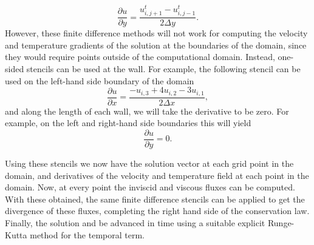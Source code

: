 \begin{equation}
	\frac{\partial u}{\partial y} = \frac{u_{i,j+1}^t - u_{i,j-1}^t}{2 \Delta y}.
\end{equation}
However, these finite difference methods will not work for computing the velocity and temperature gradients of the solution at the boundaries of the domain, since they would require points outside of the computational domain. Instead, one-sided stencils can be used at the wall. For example, the following stencil can be used on the left-hand side boundary of the domain
\begin{equation}
	\frac{\partial u}{\partial x} = \frac{-u_{i,3} + 4u_{i,2} - 3u_{i,1}}{2\Delta x},
\end{equation}
and along the length of each wall, we will take the derivative to be zero. For example, on the left and right-hand side boundaries this will yield
\begin{equation}
	\frac{\partial u}{\partial y} = 0.
\end{equation}

Using these stencils we now have the solution vector at each grid point in the domain, and derivatives of the velocity and temperature field at each point in the domain. Now, at every point the inviscid and viscous fluxes can be computed. With these obtained, the same finite difference stencils can be applied to get the divergence of these fluxes, completing the right hand side of the conservation law. Finally, the solution and be advanced in time using a suitable explicit Runge-Kutta method for the temporal term.
